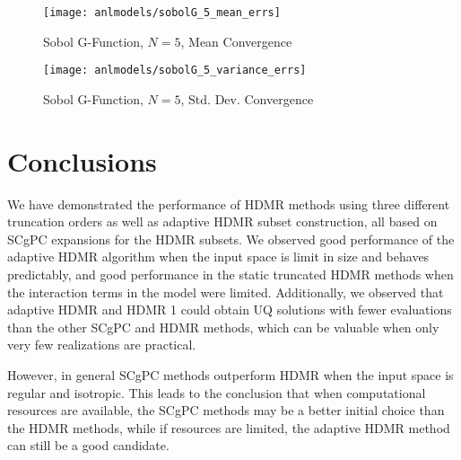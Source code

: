\begin{figure}[H]
  \centering
  \texttt{[image: anlmodels/sobolG\_5\_mean\_errs]}
  \caption{Sobol G-Function, $N=5$, Mean Convergence}
  \label{fig:sobolG mean errors 5}
\end{figure}
\begin{figure}[H]
  \centering
  \texttt{[image: anlmodels/sobolG\_5\_variance\_errs]}
  \caption{Sobol G-Function, $N=5$, Std. Dev. Convergence}
  \label{fig:sobolG var errors 5}
\end{figure}


\section{Conclusions}
We have demonstrated the performance of HDMR methods using three different truncation orders as well as
adaptive HDMR subset construction, all based on SCgPC expansions for the HDMR subsets.  We observed good
performance of the adaptive HDMR algorithm when the input space is limit in size and behaves predictably, and
good performance in the static truncated HDMR methods when the interaction terms in the model were limited.
Additionally, we observed that adaptive HDMR and HDMR 1 could obtain UQ solutions with fewer evaluations than
the other SCgPC and HDMR methods, which can be valuable when only very few realizations are practical.

However, in general SCgPC methods outperform HDMR when the input space is regular and isotropic.  This leads
to the conclusion that when computational resources are available, the SCgPC methods may be a better initial choice
than the HDMR methods, while if resources are limited, the adaptive HDMR method can still be a good candidate.
